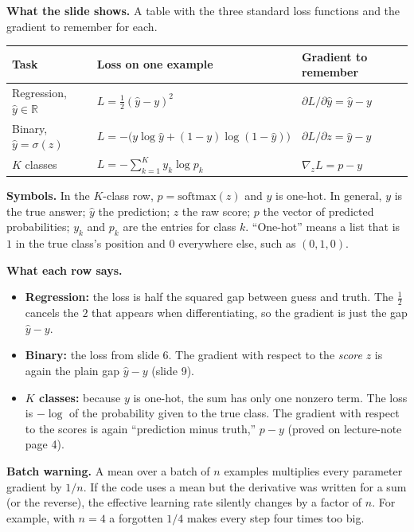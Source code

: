 \textbf{What the slide shows.} A table with the three standard loss functions and the gradient to remember for each.

\begin{center}
\begin{tabular}{p{3.0cm}p{5.6cm}p{4.4cm}}
\toprule
Task & Loss on one example & Gradient to remember \\
\midrule
Regression, $\hat{y}\in\mathbb{R}$ & $L=\tfrac12(\hat{y}-y)^2$ & $\partial L/\partial\hat{y}=\hat{y}-y$ \\[0.4em]
Binary, $\hat{y}=\sigma(z)$ & $L=-\big(y\log\hat{y}+(1-y)\log(1-\hat{y})\big)$ & $\partial L/\partial z=\hat{y}-y$ \\[0.4em]
$K$ classes & $L=-\displaystyle\sum_{k=1}^{K}y_k\log p_k$ & $\nabla_z L = p-y$ \\
\bottomrule
\end{tabular}
\end{center}

\textbf{Symbols.} In the $K$-class row, $p=\text{softmax}(z)$ and $y$ is one-hot. In general, $y$ is the true answer; $\hat{y}$ the prediction; $z$ the raw score; $p$ the vector of predicted probabilities; $y_k$ and $p_k$ are the entries for class $k$. ``One-hot'' means a list that is $1$ in the true class's position and $0$ everywhere else, such as $(0,1,0)$.

\textbf{What each row says.}
\begin{itemize}
\item \textbf{Regression:} the loss is half the squared gap between guess and truth. The $\tfrac12$ cancels the $2$ that appears when differentiating, so the gradient is just the gap $\hat{y}-y$.
\item \textbf{Binary:} the loss from slide 6. The gradient with respect to the \emph{score} $z$ is again the plain gap $\hat{y}-y$ (slide 9).
\item \textbf{$K$ classes:} because $y$ is one-hot, the sum has only one nonzero term. The loss is $-\log$ of the probability given to the true class. The gradient with respect to the scores is again ``prediction minus truth,'' $p-y$ (proved on lecture-note page 4).
\end{itemize}

\textbf{Batch warning.} A mean over a batch of $n$ examples multiplies every parameter gradient by $1/n$. If the code uses a mean but the derivative was written for a sum (or the reverse), the effective learning rate silently changes by a factor of $n$. For example, with $n=4$ a forgotten $1/4$ makes every step four times too big.


